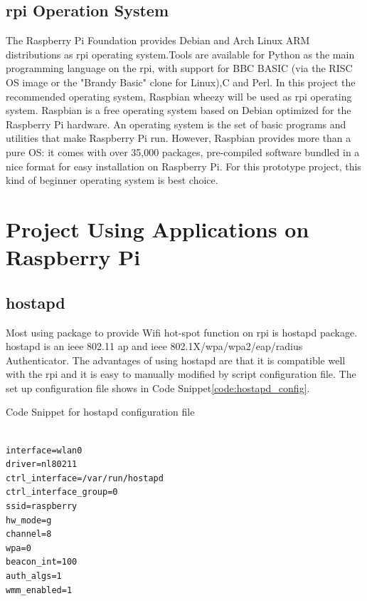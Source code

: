 \subsection{\gls{rpi} Operation System}
\par The Raspberry Pi Foundation provides Debian and Arch Linux ARM distributions as \gls{rpi} operating system.Tools are available for Python as the main programming language on the \gls{rpi}, with support for BBC BASIC (via the RISC OS image or the "Brandy Basic" clone for Linux),C and Perl. In this project the recommended operating system, Raspbian wheezy\cite{raspbian} will be used as \gls{rpi} operating system. Raspbian is a free operating system based on Debian optimized for the Raspberry Pi hardware. An operating system is the set of basic programs and utilities that make Raspberry Pi run. However, Raspbian provides more than a pure OS: it comes with over 35,000 packages, pre-compiled software bundled in a nice format for easy installation on Raspberry Pi. For this prototype project, this kind of beginner operating system is best choice.

\section{Project Using Applications on Raspberry Pi}

\subsection{hostapd}
\par Most using package to provide Wifi hot-spot function on \gls{rpi} is hostapd\cite{hostapd} package. hostapd is an \gls{ieee} 802.11 \gls{ap} and \gls{ieee} 802.1X/\gls{wpa}/\gls{wpa2}/\gls{eap}/\gls{radius} Authenticator. The  advantages of using hostapd are that it is compatible well with the \gls{rpi} and it is easy to manually modified by script configuration file. The set up configuration file shows in Code Snippet\ref{code:hostapd_config}.

\begin{algorithm}[h]
  \caption{Code Snippet for hostapd configuration file}
  \label{code:hostapd_config}
  \begin{verbatim}
  
interface=wlan0
driver=nl80211
ctrl_interface=/var/run/hostapd
ctrl_interface_group=0
ssid=raspberry
hw_mode=g
channel=8
wpa=0
beacon_int=100
auth_algs=1
wmm_enabled=1
 \end{verbatim}
\end{algorithm}

